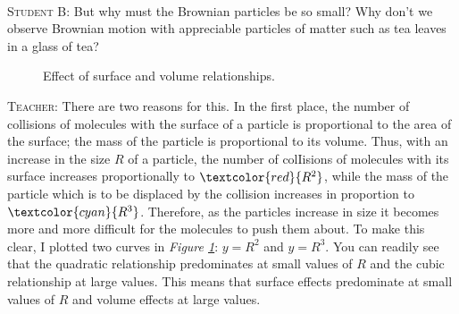 \documentclass[a4paper,sfsidenotes]{tufte-book}
\begin{document}
\\
\textsc{Student B:} But why must the Brownian particles be so small? Why don't we observe Brownian motion with appreciable particles of matter such as tea leaves in a glass of tea?
\\
\begin{figure}
\centering
\caption{Effect of surface and volume relationships.}
\label{fig-71}
\end{figure}


\textsc{Teacher:} There are two reasons for this. In the first place, the number of collisions of molecules with the surface of a particle is proportional to the area of the surface; the mass of the particle is proportional to its volume. Thus, with an increase in the size $R$ of a particle, the number of colIisions of molecules with its surface increases proportionally to $\textcolor{red}{R^{2}}$, while the mass of the particle which is to be displaced by the collision increases in proportion to $\textcolor{cyan}{R^{3}}$. Therefore, as the particles increase in size it becomes more and more difficult for the molecules to push them about. To make this clear, I plotted two curves in \emph{Figure \ref{fig-71}}: $y=R^{2}$ and $y=R^{3}$. You can readily see that the quadratic relationship predominates at small values of $R$ and the cubic relationship at large values. This means that surface effects predominate at small values of $R$ and volume effects at large values.
\end{document}
